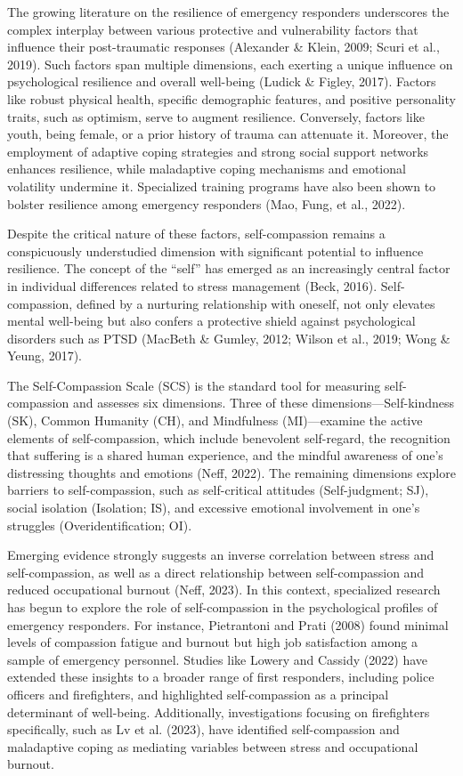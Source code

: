 \documentclass[
  man,floatsintext]{apa7}
\begin{document}
The growing literature on the resilience of emergency responders underscores the complex interplay between various protective and vulnerability factors that influence their post-traumatic responses (Alexander \& Klein, 2009; Scuri et al., 2019). Such factors span multiple dimensions, each exerting a unique influence on psychological resilience and overall well-being (Ludick \& Figley, 2017). Factors like robust physical health, specific demographic features, and positive personality traits, such as optimism, serve to augment resilience. Conversely, factors like youth, being female, or a prior history of trauma can attenuate it. Moreover, the employment of adaptive coping strategies and strong social support networks enhances resilience, while maladaptive coping mechanisms and emotional volatility undermine it. Specialized training programs have also been shown to bolster resilience among emergency responders (Mao, Fung, et al., 2022).

Despite the critical nature of these factors, self-compassion remains a conspicuously understudied dimension with significant potential to influence resilience. The concept of the ``self'' has emerged as an increasingly central factor in individual differences related to stress management (Beck, 2016). Self-compassion, defined by a nurturing relationship with oneself, not only elevates mental well-being but also confers a protective shield against psychological disorders such as PTSD (MacBeth \& Gumley, 2012; Wilson et al., 2019; Wong \& Yeung, 2017).

The Self-Compassion Scale (SCS) is the standard tool for measuring self-compassion and assesses six dimensions. Three of these dimensions---Self-kindness (SK), Common Humanity (CH), and Mindfulness (MI)---examine the active elements of self-compassion, which include benevolent self-regard, the recognition that suffering is a shared human experience, and the mindful awareness of one's distressing thoughts and emotions (Neff, 2022). The remaining dimensions explore barriers to self-compassion, such as self-critical attitudes (Self-judgment; SJ), social isolation (Isolation; IS), and excessive emotional involvement in one's struggles (Overidentification; OI).

Emerging evidence strongly suggests an inverse correlation between stress and self-compassion, as well as a direct relationship between self-compassion and reduced occupational burnout (Neff, 2023). In this context, specialized research has begun to explore the role of self-compassion in the psychological profiles of emergency responders. For instance, Pietrantoni and Prati (2008) found minimal levels of compassion fatigue and burnout but high job satisfaction among a sample of emergency personnel. Studies like Lowery and Cassidy (2022) have extended these insights to a broader range of first responders, including police officers and firefighters, and highlighted self-compassion as a principal determinant of well-being. Additionally, investigations focusing on firefighters specifically, such as Lv et al. (2023), have identified self-compassion and maladaptive coping as mediating variables between stress and occupational burnout.
\end{document}
